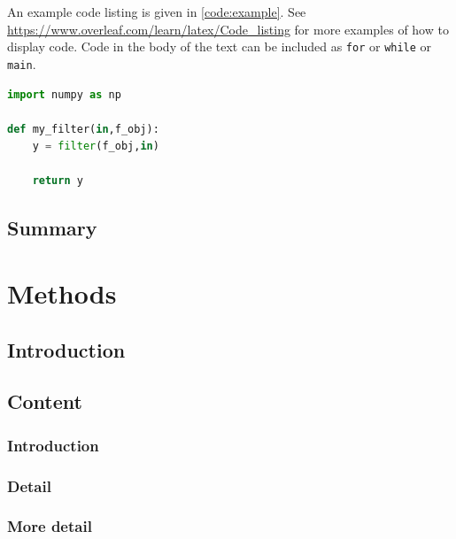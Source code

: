     An example code listing is given in \autoref{code:example}. See \url{https://www.overleaf.com/learn/latex/Code_listing} for more examples of how to display code. Code in the body of the text can be included as \lstinline{for} or \lstinline{while} or \lstinline{main}.

    \begin{lstlisting}[language=Python, caption={My code example}, label={code:example}]
import numpy as np
    
def my_filter(in,f_obj):
    y = filter(f_obj,in)
    
    return y
    \end{lstlisting}
  
  \subsection{Summary}
    \lipsum[6] %
  
  
  
\section{Methods} \label{sec:methods}

  \subsection{Introduction}
    \lipsum[1] %
  
  \subsection{Content} \label{sec:content}
    \subsubsection{Introduction}
      \lipsum[1] %
	
    \subsubsection{Detail}
      \lipsum[7-11] %
    
    \subsubsection{More detail}
      \lipsum[1-3] %
	
